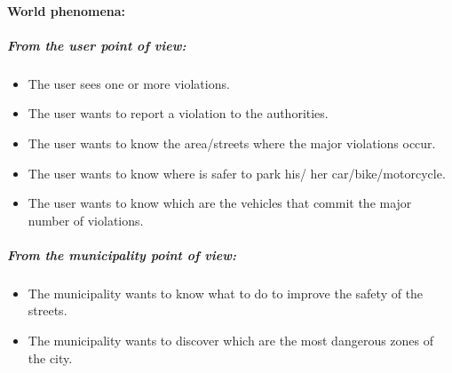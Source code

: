 \documentclass[titlepage]{article}
\begin{document}
\paragraph{World phenomena: }
\subparagraph{From the user point of view: }
\begin{itemize}	
	\item The user sees one or more violations.
	\item The user wants to report a violation to the 					  authorities.
	\item The user wants to know the area/streets where the 
	     major violations occur.
	\item The user wants to know where is safer to park his/			  her car/bike/motorcycle.
	\item The user wants to know which are the vehicles that       		  commit the major number of violations.

\end{itemize}
\subparagraph{From the municipality point of view: }

\begin{itemize}
	\item The municipality wants to know what to do to 				improve the safety of the streets.
	\item The municipality wants to discover which are the most
	dangerous zones of the city.\\
\end{itemize}
 
\end{document}

